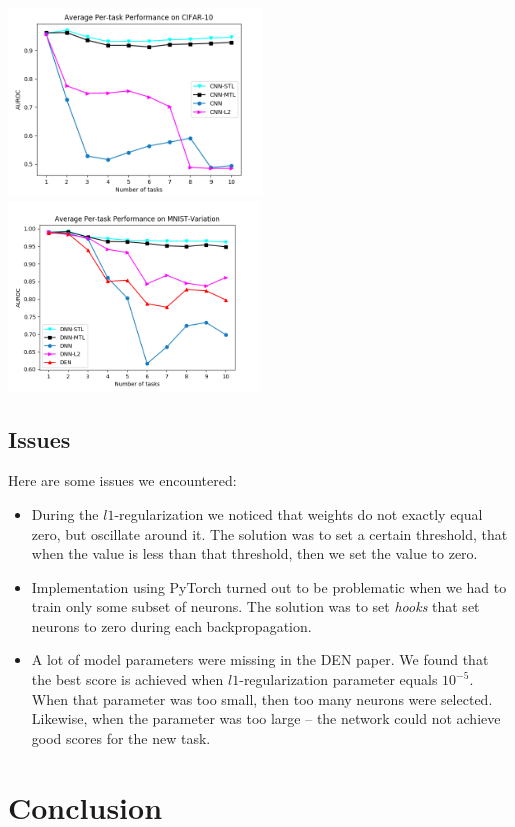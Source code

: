 \documentclass[12pt]{article}
\begin{document}
    \includegraphics[height=5cm]{fig1-s.png}
    \includegraphics[height=5cm]{fig2-v2.png}

    \subsection{Issues}

    Here are some issues we encountered:

    \begin{itemize}
        \item During the $l1$-regularization we noticed that weights do not exactly equal zero, but
        oscillate around it. The solution was to set a certain threshold, that when the value is less than
        that threshold, then we set the value to zero.
        \item Implementation using PyTorch turned out to be problematic when we had to train only
        some subset of neurons. The solution was to set \textit{hooks} that set neurons to zero
        during each backpropagation.
        \item A lot of model parameters were missing in the DEN paper. We found that the best score is
        achieved when $l1$-regularization parameter equals $10^{-5}$. When that parameter was too small,
        then too many neurons were selected. Likewise, when the parameter was too large -- the network
        could not achieve good scores for the new task.
    \end{itemize}

    \section {Conclusion}
    
\end{document}
